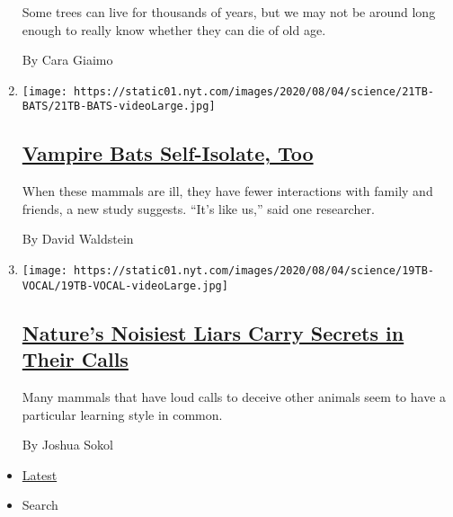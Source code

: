 \begin{enumerate}
  Some trees can live for thousands of years, but we may not be around
  long enough to really know whether they can die of old age.

  By Cara Giaimo
\item
  \texttt{[image: https://static01.nyt.com/images/2020/08/04/science/21TB-BATS/21TB-BATS-videoLarge.jpg]}

  \hypertarget{vampire-bats-self-isolate-too}{%
  \subsection{\texorpdfstring{\href{/2020/07/22/science/vampire-bats-viruses.html}{Vampire
  Bats Self-Isolate,
  Too}}{Vampire Bats Self-Isolate, Too}}\label{vampire-bats-self-isolate-too}}

  When these mammals are ill, they have fewer interactions with family
  and friends, a new study suggests. ``It's like us,'' said one
  researcher.

  By David Waldstein
\item
  \texttt{[image: https://static01.nyt.com/images/2020/08/04/science/19TB-VOCAL/19TB-VOCAL-videoLarge.jpg]}

  \hypertarget{natures-noisiest-liars-carry-secrets-in-their-calls}{%
  \subsection{\texorpdfstring{\href{/2020/07/21/science/mammals-vocal-learning.html}{Nature's
  Noisiest Liars Carry Secrets in Their
  Calls}}{Nature's Noisiest Liars Carry Secrets in Their Calls}}\label{natures-noisiest-liars-carry-secrets-in-their-calls}}

  Many mammals that have loud calls to deceive other animals seem to
  have a particular learning style in common.

  By Joshua Sokol
\end{enumerate}

\begin{itemize}
\tightlist
\item
  \protect\hyperlink{stream-panel}{Latest}
\item
  Search
\end{itemize}


